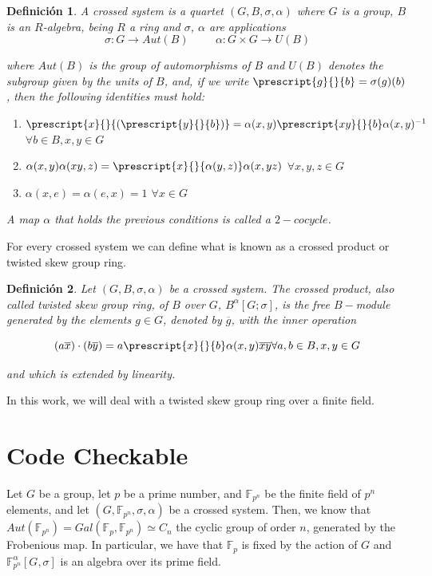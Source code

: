 \documentclass{article}
\newtheorem{definition}{Definición}
\begin{document}
\begin{definition}
A crossed system is a quartet $(G,B,\sigma,\alpha)$ where $G$ is a group, $B$ is an $R$-algebra, being $R$ a ring and $\sigma$, $\alpha$ are applications
\begin{equation}
\sigma : G \rightarrow Aut(B) \hspace{1cm}
\alpha: G \times G \rightarrow U(B)
\end{equation}

\noindent where $Aut(B)$ is the  group of automorphisms of $B$ and $U(B)$ denotes the subgroup given by the units of $B$, and, if we write $\prescript{g}{}{{b}} = \sigma(g)(b)$, then the following identities must hold: 

\begin{enumerate} 
\item $\prescript{x}{}{{(\prescript{y}{}{{b}})}} = \alpha(x,y) \prescript{xy}{}{{b}} \alpha(x,y)^{-1}$$\forall b \in B, x,y \in G$
\item $ \alpha(x,y)\alpha(xy,z)=\prescript{x}{}{\alpha(y,z)} \alpha(x,yz)$ $\forall x,y,z \in G$
\item $ \alpha(x,e) = \alpha(e,x) = 1$ $\forall x \in G$
\end{enumerate}

A map $\alpha$ that holds the previous conditions is called a $2-cocycle$.
\end{definition}

For every crossed system we can define what is known as a crossed product or twisted skew group ring.

\begin{definition}
Let $(G,B,\sigma,\alpha)$ be a crossed system. The crossed product, also called twisted skew group ring, of $B$ over $G$, $B^\alpha [ G; \sigma]$, is the free $B-$module generated by the elements $g\in G$, denoted by $\overline{g}$, with the inner operation

\begin{equation}
(a \overline{x}) \cdot (b \overline{y}) = a \prescript{x}{}{b} \alpha(x,y) \overline{xy} \forall a,b \in B, x,y \in G
\end{equation}

\noindent and which is extended by linearity.
\end{definition}

In this work, we will deal with a twisted skew group ring over a finite field.

\section{Code Checkable}
Let $G$ be a group, let $p$ be a prime number, and $\mathbb{F}_{p^n}$ be the finite field of $p^n$ elements, and let $(G,\mathbb{F}_{p^n},\sigma,\alpha)$ be a crossed system. Then, we know that $Aut(\mathbb{F}_{p^n}) = Gal(\mathbb{F}_p,\mathbb{F}_{p^n})\simeq C_n$ the cyclic group of order $n$, generated by the Frobenious map. In particular, we have that $\mathbb{F}_p$ is fixed by the action of $G$ and $\mathbb{F}_{p^n}^\alpha[G,\sigma]$ is an algebra over its prime field.
\end{document}
